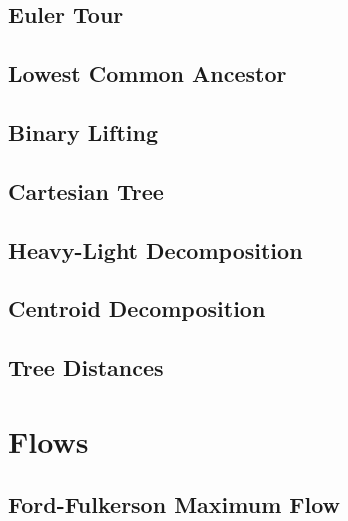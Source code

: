 \documentclass[10pt]{article}
\begin{document}
\begin{multicols*}{2}
\subsection{Euler Tour}


\subsection{Lowest Common Ancestor}


\subsection{Binary Lifting}


\subsection{Cartesian Tree}


\subsection{Heavy-Light Decomposition}


\subsection{Centroid Decomposition}


\subsection{Tree Distances}


\section{Flows}

\subsection{Ford-Fulkerson Maximum Flow}



\end{multicols*}
\end{document}
